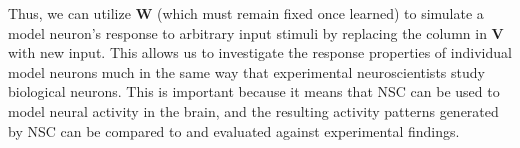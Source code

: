 Thus, we can utilize \textbf{W} 
(which must remain fixed once learned)
to simulate a model neuron's response to arbitrary input stimuli
by replacing the column in \textbf{V} with new input.
This allows us to investigate the response properties 
of individual model neurons
much in the same way that experimental neuroscientists 
study biological neurons.
This is important because it means that \ac{NSC} can be used to 
model neural activity in the brain, 
and the resulting activity patterns generated by \ac{NSC}
can be compared to and evaluated against experimental findings. 

